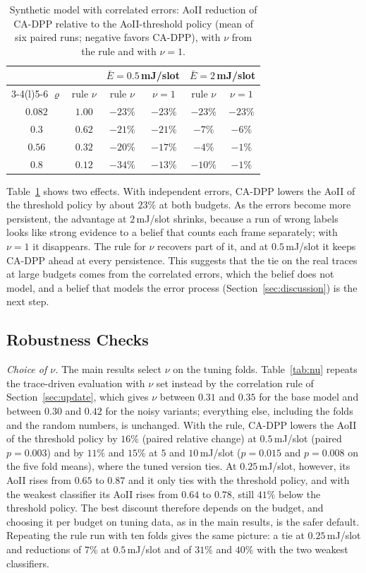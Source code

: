 \documentclass[5p,twocolumn]{elsarticle}
\theoremstyle{remark}
\begin{document}
\begin{table}[t]
\caption{Synthetic model with correlated errors: AoII reduction of CA-DPP relative to the AoII-threshold policy (mean of six paired runs; negative favors CA-DPP), with $\nu$ from the rule and with $\nu=1$.}\label{tab:corr}
\centering\footnotesize
\begin{tabular}{@{}cccccc@{}}
\toprule
 & & \multicolumn{2}{c}{$\bar E=0.5$\,mJ/slot} & \multicolumn{2}{c}{$\bar E=2$\,mJ/slot}\\
\cmidrule(lr){3-4}\cmidrule(l){5-6}
$\varrho$ & rule $\nu$ & rule $\nu$ & $\nu=1$ & rule $\nu$ & $\nu=1$\\
\midrule
$0.082$ & $1.00$ & $-23\%$ & $-23\%$ & $-23\%$ & $-23\%$\\
$0.3$ & $0.62$ & $-21\%$ & $-21\%$ & $-7\%$ & $-6\%$\\
$0.56$ & $0.32$ & $-20\%$ & $-17\%$ & $-4\%$ & $-1\%$\\
$0.8$ & $0.12$ & $-34\%$ & $-13\%$ & $-10\%$ & $-1\%$\\
\bottomrule
\end{tabular}
\end{table}

Table~\ref{tab:corr} shows two effects. With independent errors, CA-DPP lowers the AoII of the threshold policy by about $23\%$ at both budgets. As the errors become more persistent, the advantage at $2$\,mJ/slot shrinks, because a run of wrong labels looks like strong evidence to a belief that counts each frame separately; with $\nu=1$ it disappears. The rule for $\nu$ recovers part of it, and at $0.5$\,mJ/slot it keeps CA-DPP ahead at every persistence. This suggests that the tie on the real traces at large budgets comes from the correlated errors, which the belief does not model, and a belief that models the error process (Section~\ref{sec:discussion}) is the next step.

\subsection{Robustness Checks}\label{res:robust}
\emph{Choice of $\nu$.} The main results select $\nu$ on the tuning folds. Table~\ref{tab:nu} repeats the trace-driven evaluation with $\nu$ set instead by the correlation rule of Section~\ref{sec:update}, which gives $\nu$ between $0.31$ and $0.35$ for the base model and between $0.30$ and $0.42$ for the noisy variants; everything else, including the folds and the random numbers, is unchanged. With the rule, CA-DPP lowers the AoII of the threshold policy by $16\%$ (paired relative change) at $0.5$\,mJ/slot (paired $p=0.003$) and by $11\%$ and $15\%$ at $5$ and $10$\,mJ/slot ($p=0.015$ and $p=0.008$ on the five fold means), where the tuned version ties. At $0.25$\,mJ/slot, however, its AoII rises from $0.65$ to $0.87$ and it only ties with the threshold policy, and with the weakest classifier its AoII rises from $0.64$ to $0.78$, still $41\%$ below the threshold policy. The best discount therefore depends on the budget, and choosing it per budget on tuning data, as in the main results, is the safer default. Repeating the rule run with ten folds gives the same picture: a tie at $0.25$\,mJ/slot and reductions of $7\%$ at $0.5$\,mJ/slot and of $31\%$ and $40\%$ with the two weakest classifiers.
\end{document}
